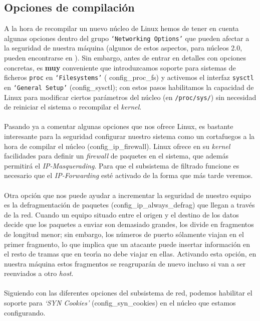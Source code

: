 \subsection{Opciones de compilaci\'on}
A la hora de recompilar un nuevo n\'ucleo de Linux hemos de tener en cuenta
algunas opciones dentro del grupo {\tt `Networking Options'} que pueden afectar
a la seguridad de nuestra m\'aquina (algunos de estos aspectos, para n\'ucleos
2.0, pueden encontrarse en \cite{kn:wre98}). Sin embargo, antes de entrar en
detalles con opciones concretas, es {\bf muy} conveniente que introduzcamos
soporte para sistemas de ficheros {\tt proc} en {\tt `Filesystems'} ({\sc 
config\_proc\_fs}) y activemos el interfaz {\tt sysctl} en {\tt `General
Setup'} ({\sc config\_sysctl}); con estos pasos habilitamos la capacidad de 
Linux para modificar ciertos par\'ametros del n\'ucleo (en {\tt /proc/sys/}) 
sin necesidad de reiniciar el sistema o recompilar el {\it kernel}.\\
\\Pasando ya a comentar algunas opciones que nos ofrece Linux, es bastante 
interesante para la seguridad configurar nuestro sistema como un cortafuegos
a la hora de compilar el n\'ucleo ({\sc config\_ip\_firewall}). Linux ofrece
en su {\it kernel} facilidades para definir un {\it firewall} de paquetes en
el sistema, que adem\'as permitir\'a el {\it IP-Masquerading}. Para que el
subsistema de filtrado funcione es necesario que el {\it IP-Forwarding} est\'e
activado de la forma que m\'as tarde veremos.\\
\\Otra opci\'on que nos puede ayudar a incrementar la seguridad de nuestro
equipo es la defragmentaci\'on de paquetes ({\sc config\_ip\_always\_defrag})
que llegan a trav\'es de la red. Cuando un equipo situado entre el origen y el 
destino de los datos 
decide que los paquetes a enviar son demasiado grandes, los divide en fragmentos
de longitud menor; sin embargo, los n\'umeros de puerto s\'olamente viajan
en el primer fragmento, lo que implica que un atacante puede insertar 
informaci\'on en el resto de tramas que en teor\'{\i}a no debe viajar en ellas.
Activando esta opci\'on, en nuestra m\'aquina estos fragmentos se reagrupar\'an
de nuevo incluso si van a ser reenviados a otro {\it host}.\\
\\Siguiendo con las diferentes opciones del subsistema de red, podemos habilitar
el soporte para {\it `SYN Cookies'} ({\sc config\_syn\_cookies}) en el n\'ucleo 
que estamos configurando.
